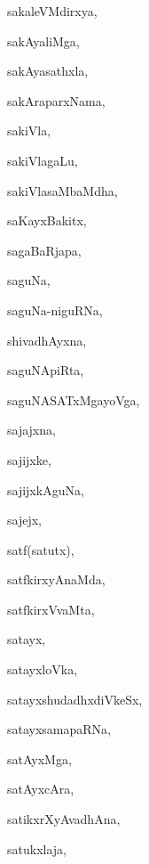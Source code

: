 \begin{multicols}{3}
{\noindent
{sakaleVMdirxya}, \pageref{sakaleVMdirxya}

\noindent
{sakAyaliMga}, \pageref{sakAyaliMga}

\noindent
{sakAyasathxla}, \pageref{sakAyasathxla}

\noindent
{sakAraparxNama}, \pageref{sakAraparxNama}

\noindent
{sakiVla}, \pageref{sakiVla}

\noindent
{sakiVlagaLu}, \pageref{sakiVlagaLu}

\noindent
{sakiVlasaMbaMdha}, \pageref{sakiVlasaMbaMdha}

\noindent
{saKayxBakitx}, \pageref{saKayxBakitx}

\noindent
{sagaBaRjapa}, \pageref{sagaBaRjapa}

\noindent
{saguNa}, \pageref{saguNa}

\noindent
{saguNa-niguRNa}, \pageref{saguNa-niguRNa}

\noindent
{shivadhAyxna}, \pageref{shivadhAyxna}

\noindent
{saguNApiRta}, \pageref{saguNApiRta}

\noindent
{saguNASATxMgayoVga}, \pageref{saguNASATxMgayoVga}

\noindent
{sajajxna}, \pageref{sajajxna}

\noindent
{sajijxke}, \pageref{sajijxke}

\noindent
{sajijxkAguNa}, \pageref{sajijxkAguNa}

\noindent
{sajejx}, \pageref{sajejx}

\noindent
{satf(satutx)}, \pageref{satfsatutx}

\noindent
{satfkirxyAnaMda}, \pageref{satfkirxyAnaMda}

\noindent
{satfkirxVvaMta}, \pageref{satfkirxVvaMta}

\noindent
{satayx}, \pageref{satayx}

\noindent
{satayxloVka}, \pageref{satayxloVka}

\noindent
{satayxshudadhxdiVkeSx}, \pageref{satayxshudadhxdiVkeSx}

\noindent
{satayxsamapaRNa}, \pageref{satayxsamapaRNa}

\noindent
{satAyxMga}, \pageref{satAyxMga}

\noindent
{satAyxcAra}, \pageref{satAyxcAra}

\noindent
{satikxrXyAvadhAna}, \pageref{satikxrXyAvadhAna}

\noindent
{satukxlaja}, \pageref{satukxlaja}

}
\end{multicols}
